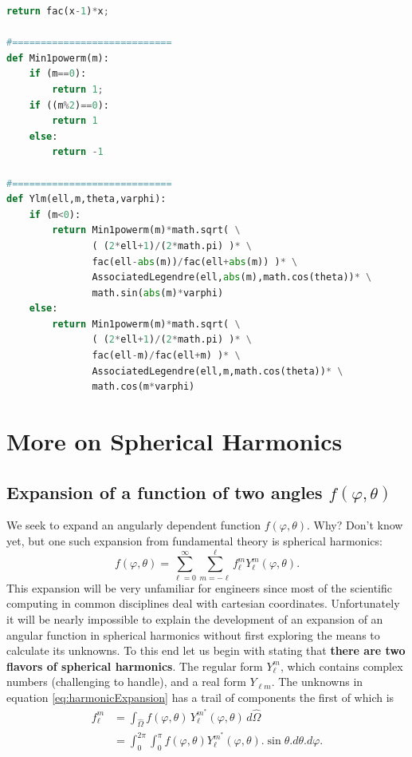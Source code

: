 \documentclass[11pt,letterpaper,titlepage]{article}
\renewcommand{\thefigure}{\arabic{section}.\arabic{figure}}
\numberwithin{equation}{section}
\begin{document}
\begin{appendices}
\begin{lstlisting}[language=python]
    return fac(x-1)*x;

#============================
def Min1powerm(m):
    if (m==0):
        return 1;
    if ((m%2)==0):
        return 1
    else:
        return -1

#============================    
def Ylm(ell,m,theta,varphi):
    if (m<0):
        return Min1powerm(m)*math.sqrt( \
               ( (2*ell+1)/(2*math.pi) )* \
               fac(ell-abs(m))/fac(ell+abs(m)) )* \
               AssociatedLegendre(ell,abs(m),math.cos(theta))* \
               math.sin(abs(m)*varphi)
    else:
        return Min1powerm(m)*math.sqrt( \
               ( (2*ell+1)/(2*math.pi) )* \
               fac(ell-m)/fac(ell+m) )* \
               AssociatedLegendre(ell,m,math.cos(theta))* \
               math.cos(m*varphi)
\end{lstlisting} 




\newpage 
\renewcommand{\thefigure}{B\arabic{section}.\arabic{figure}}
\section{More on Spherical Harmonics}
\subsection{Expansion of a function of two angles $f(\varphi,\theta)$}
We seek to expand an angularly dependent function $f(\varphi,\theta)$. Why? Don't know yet, but one such expansion from fundamental theory is spherical harmonics:
\begin{equation} \label{eq:harmonicExpansion}
f(\varphi,\theta) = \sum_{\ell=0}^{\infty}\sum_{m=-\ell}^{\ell}   f_{\ell }^m Y_{\ell }^m(\varphi,\theta  ).
\end{equation}
\newline
This expansion will be very unfamiliar for engineers since most of the scientific computing in common disciplines deal with cartesian coordinates. Unfortunately it will be nearly impossible to explain the development of an expansion of an angular function in spherical harmonics without first exploring the means to calculate its unknowns. To this end let us begin with stating that \textbf{there are two flavors of spherical harmonics}. The regular form $Y_{\ell}^m$, which contains complex numbers (challenging to handle), and a real form $Y_{\ell m}$.
The unknowns in equation \ref{eq:harmonicExpansion} has a trail of components the first of which is
\begin{equation*}
\begin{aligned}
f_{\ell }^m
&=\int _{\hat{\Omega} }f(\varphi,\theta )\,Y_{\ell }^{m^*}(\varphi,\theta)\,d\hat{\Omega} \\
&=\int _{0}^{2\pi }\int _{0}^{\pi } f(\varphi,\theta )Y_{\ell }^{m^*}(\varphi,\theta ) .\sin \theta .d\theta .d\varphi .
\end{aligned}
\end{equation*}


\end{appendices}
\end{document}
